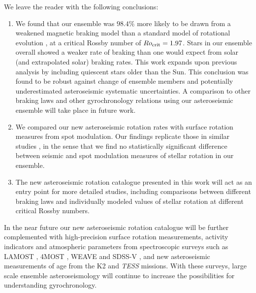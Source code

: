 \documentclass[12pt]{article}
\newcommand{\tess}{\emph{TESS}\xspace}
\newcommand{\ktwo}{K2\xspace}
\newcommand{\rtwo}[1]{{#1}}
\begin{document}
We leave the reader with the following conclusions:
\begin{enumerate}
	\item We found that our ensemble was $98.4\%$ more likely to be drawn from a weakened magnetic braking model than a standard model of rotational evolution \cite{vansaders+pinsonneault2013}, at a critical Rossby number of $Ro_{\rm{crit}} = 1.97$. \rtwo{Stars in our ensemble overall showed a weaker rate of braking than one would expect from solar (and extrapolated solar) braking rates.} This work expands upon previous analysis \cite{vansaders+2019} by including quiescent stars older than the Sun. This conclusion was found to be robust against change of ensemble members and potentially underestimated asteroseismic systematic uncertainties. A comparison to other braking laws \cite{matt+2015} and other gyrochronology relations \cite{barnes2010} using our asteroseismic ensemble will take place in future work.
	
	\item We compared our new asteroseismic rotation rates with surface rotation measures from spot modulation. Our findings replicate those in similar studies \cite{nielsen+2015,benomar+2015}, in the sense that we find no statistically significant difference between seismic and spot modulation measures of stellar rotation in our ensemble.
	
	\item The new asteroseismic rotation catalogue presented in this work will act as an entry point for more detailed studies, including comparisons between different braking laws and individually modeled values of stellar rotation at different critical Rossby numbers.
	
\end{enumerate}

In the near future our new asteroseismic rotation catalogue will be further complemented with high-precision surface rotation measurements, activity indicators and atmospheric parameters from spectroscopic surveys such as LAMOST \cite{deng+2012}, 4MOST \cite{dejong+2014}, WEAVE \cite{dalton+2014} and SDSS-V \cite{blanton+2019, kollmeier+2019}, and new asteroseismic measurements of age from the \ktwo and \tess missions. With these surveys, large scale ensemble asteroseismology will continue to increase the possibilities for understanding gyrochronology.\\


%
\end{document}
